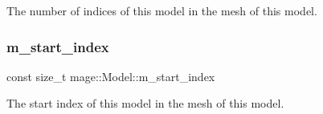 The number of indices of this model in the mesh of this model. \hypertarget{classmage_1_1_model_a63a3e697c9eb1606249de15cc7b818c3}{}\label{classmage_1_1_model_a63a3e697c9eb1606249de15cc7b818c3} 
\subsubsection{\texorpdfstring{m\+\_\+start\+\_\+index}{m\_start\_index}}
{\footnotesize\ttfamily const size\+\_\+t mage\+::\+Model\+::m\+\_\+start\+\_\+index\hspace{0.3cm}{\ttfamily [private]}}

The start index of this model in the mesh of this model. 